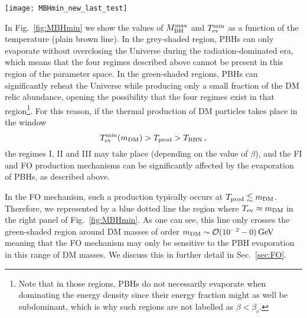 \documentclass[aps,prd,reprint,twocolumn,preprintnumbers,floatfix,nofootinbib]{revtex4-1}
\newcommand{\be}{\begin{equation}}
\newcommand{\ee}{\end{equation}}
\newcommand{\mDM}{m_{\rm DM}}
\newcommand{\MBH}{M_{\rm BH}}
\newcommand{\secref}[1]{Sec.~\ref{#1}}
\begin{document}
\begin{figure*}[t!]
 \texttt{[image: MBHmin\_new\_last\_test]}
 \caption{Maximum PBH mass (left panel, brown curve) and the corresponding minimum evaporation temperature (right panel, brown curve) leading to the correct relic abundance of DM particles when it is exclusively produced through PBH evaporation (no mediator, and no BH spin). See the description of the different curves in the text. {The grey-shaded area corresponds to the region where PBHs can only be produced below the critical density in order to not overclose the universe. The green-shaded area corresponds to regions where PBHs are able to dominate the energy density of the universe and evaporate without overclosing the Universe. The blue-dashed line denotes the contour where the PBHs evaporation temperature equals the DM mass.} \label{fig:MBHmin} } 
\end{figure*}
In Fig.~\ref{fig:MBHmin} we show the values of $\MBH^{\rm max}$ and $T_{\rm ev}^{\rm min}$ as a function of the temperature (plain brown line). In the grey-shaded region, PBHs can only evaporate without overclosing the Universe during the radiation-dominated era, which means that the four regimes described above cannot be present in this region of the parameter space. In the green-shaded regions, PBHs can significantly reheat the Universe while producing only a small fraction of the DM relic abundance, opening the possibility that the four regimes exist in that region\footnote{Note that in those regions, PBHs do not necessarily evaporate when dominating the energy density since their energy fraction might as well be subdominant, which is why such regions are not labelled as $\beta<\beta_c$.}. For this reason, if the thermal production of DM particles takes place in the window
\be
T_{\rm ev}^{\rm min}(\mDM)> T_{\rm prod}>T_{\rm BBN}\,,
\ee
the regimes I, II and III may take place (depending on the value of $\beta$), and the FI and FO production mechanisms can be significantly affected by the evaporation of PBHs, as described above.

In the FO mechanism, such a production typically occurs at $T_{\rm prod}\lesssim \mDM$. Therefore, we represented by a blue dotted line the region where $T_{\rm ev}\approx \mDM$ in the right panel of Fig.~\ref{fig:MBHmin}. As one can see, this line only crosses the green-shaded region around DM masses of order $\mDM\sim \mathcal O(10^{-2}-0) \,\mathrm{GeV}$ meaning that the FO mechanism may only be sensitive to the PBH evaporation in this range of DM masses. We discuss this in further detail in \secref{sec:FO}.
\end{document}
